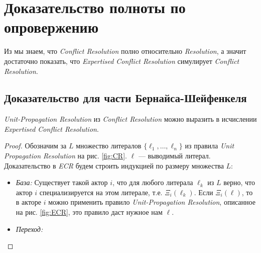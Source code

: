 





\section{Доказательство полноты по опровержению}

Из \cite{DBLP:journals/corr/SlaneyP16} мы знаем, что \emph{Conflict Resolution} полно относительно \emph{Resolution}, а значит достаточно показать, что \emph{Expertised Conflict Resolution} симулирует \emph{Conflict Resolution}.

\subsection{Доказательство для части Бернайса-Шейфенкеля}
\begin{lemma}
\emph{Unit-Propagation Resolution} из \emph{Conflict Resolution} можно выразить в исчислении \emph{Expertised Conflict Resolution}.
\end{lemma}
\begin{proof}
Обозначим за $L$ множество литералов $\{\ell_1, \ldots, \ell_n\}$ из правила \emph{Unit Propagation Resolution} на рис. \ref{fig:CR}. $\ell$ --- выводимый литерал.
Доказательство в \emph{ECR} будем строить индукцией по размеру множества $L$:
\begin{itemize}[label=$\star$]
	\item \emph{База:} Существует такой актор $i$, что для любого литерала $\ell_k$ из $L$ верно, что актор $i$ специализируется на этом литерале, т.е. $\Xi_i(\ell_k)$. Если $\Xi_i(\ell)$, то в акторе $i$ можно применить правило \emph{Unit-Propagation Resolution}, описанное на рис. \ref{fig:ECR}, это правило даст нужное нам $\ell$. 
    \item \emph{Переход:} 
\end{itemize}
\end{proof}

